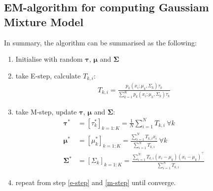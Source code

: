 \documentclass{article} [10pt] %
\newcommand{\bs}{\boldsymbol}
\begin{document}
\subsection{EM-algorithm for computing Gaussiam Mixture Model}
In summary, the algorithm can be summarised as the following:
\begin{enumerate}
	\item Initialise with random $\bs\tau$, $\bs\mu$ and $\bs\Sigma$
	\item\label{e-step} take E-step, calculate $T_{k, i}$:
		\begin{align}
		\boxed{
			T_{k, i}=\frac{p_k(x_i;\mu_k,\Sigma_k)\tau_k}{\sum_{k=1}^Kp_k(x_i;\mu_k,\Sigma_k)\tau_k}
		}
		\end{align}
	\item\label{m-step}  take M-step, update $\bs\tau$, $\bs\mu$ and $\bs\Sigma$:
		\begin{align}
			\bs\tau^* &= [\tau_k^*]_{k=1:K} = \frac{1}{N}\sum_{i=1}^N T_{k, i} \ \forall k\\
			\bs\mu^*&=[\mu_k^*]_{k=1:K} = \frac{\sum_{i=1}^NT_{k, i}x_i}{\sum_{i=1}^N  T_{k, i}} \ \forall k\\
			\bs\Sigma^*&=[\Sigma_k]_{k=1:K}=\frac{\sum_{i=1}^N T_{k, i}(x_i-\mu_k)(x_i-\mu_k)^\top}{ \sum_{i=1}^N T_{k, i}}
		\end{align}
	\item repeat from step \ref{e-step} and  \ref{m-step} until converge.
\end{enumerate}
%
\end{document}
